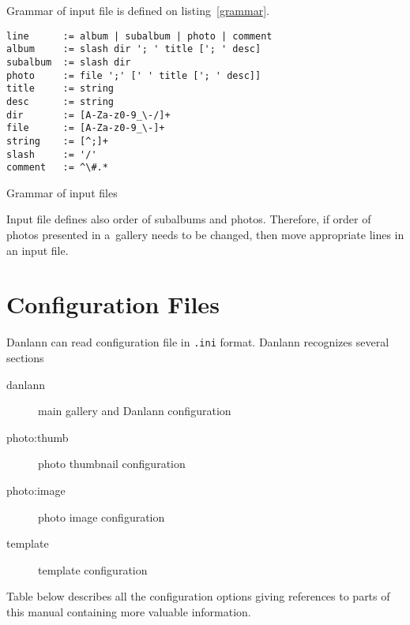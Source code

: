 \documentclass{article}
\begin{document}
Grammar of input file is defined on listing~\ref{grammar}.

\begin{listing}
\begin{lstlisting}
line      := album | subalbum | photo | comment
album     := slash dir '; ' title ['; ' desc]
subalbum  := slash dir
photo     := file ';' [' ' title ['; ' desc]]
title     := string
desc      := string
dir       := [A-Za-z0-9_\-/]+
file      := [A-Za-z0-9_\-]+
string    := [^;]+
slash     := '/'
comment   := ^\#.*
\end{lstlisting}
\caption{Grammar of input files}\label{grammar}
\end{listing}

Input file defines also order of subalbums and photos. 
Therefore, if order of photos presented in a~gallery needs to be changed, then
move appropriate lines in an input file.

\section{Configuration Files}\label{conf:all}
Danlann can read configuration file in \texttt{.ini} format. Danlann
recognizes several sections
\begin{description}
\item[danlann] main gallery and Danlann configuration
\item[photo:thumb] photo thumbnail configuration
\item[photo:image] photo image configuration
\item[template] template configuration
\end{description}

Table below describes all the configuration options giving references to
parts of this manual containing more valuable information.
\end{document}
